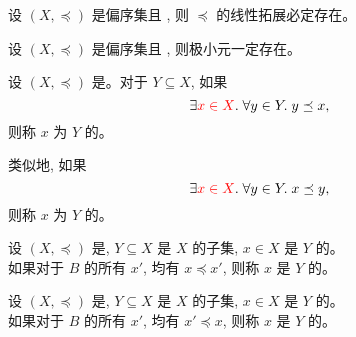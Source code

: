 \begin{frame}{}
  \begin{theorem}
    设 $(X, \preceq)$ 是偏序集且 , 则 $\preceq$ 的线性拓展必定存在。
  \end{theorem}


  \pause
  \vspace{0.30cm}
  \begin{theorem}
    设 $(X, \preceq)$ 是偏序集且 , 则极小元一定存在。
  \end{theorem}
\end{frame}

\begin{frame}{}
  \begin{definition}
    设 $(X, \preceq)$ 是。对于 $Y \subseteq X$, 如果
    \[
      \exists \textcolor{red}{x \in X}.\; \forall y \in Y.\; y \preceq x,
    \]
    则称 $x$ 为 $Y$ 的。

    \pause
    \vspace{0.30cm}
    类似地, 如果
    \[
      \exists \textcolor{red}{x \in X}.\; \forall y \in Y.\; x \preceq y,
    \]
    则称 $x$ 为 $Y$ 的。
  \end{definition}

  \pause
\end{frame}

\begin{frame}{}
  \begin{definition}
    设 $(X, \preceq)$ 是, $Y \subseteq X$ 是 $X$ 的子集,
    $x \in X$ 是 $Y$ 的。 \pause\\[5pt]
    如果对于 $B$ 的所有 $x'$, 均有 $x \preceq x'$,
    则称 $x$ 是 $Y$ 的。
  \end{definition}

  \pause

  \pause
  \begin{definition}
    设 $(X, \preceq)$ 是, $Y \subseteq X$ 是 $X$ 的子集,
    $x \in X$ 是 $Y$ 的。 \\[5pt]
    如果对于 $B$ 的所有 $x'$, 均有 $x' \preceq x$,
    则称 $x$ 是 $Y$ 的。
  \end{definition}
\end{frame}

